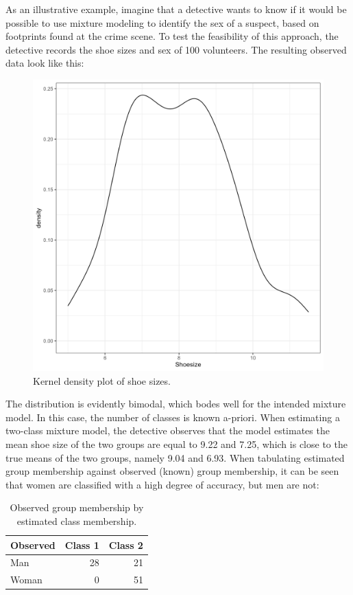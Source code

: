 \documentclass[
  ,man,floatsintext]{apa6}
\begin{document}
As an illustrative example, imagine that a detective wants to know if it
would be possible to use mixture modeling to identify the sex of a
suspect, based on footprints found at the crime scene. To test the
feasibility of this approach, the detective records the shoe sizes and
sex of 100 volunteers. The resulting observed data look like this:

\begin{figure}
\includegraphics[width=7in]{shoedens} \caption{Kernel density plot of shoe sizes.}\label{fig:shoedens}
\end{figure}

The distribution is evidently bimodal, which bodes well for the intended
mixture model. In this case, the number of classes is known a-priori.
When estimating a two-class mixture model, the detective observes that
the model estimates the mean shoe size of the two groups are equal to
9.22 and
7.25, which is close to the true
means of the two groups, namely 9.04
and 6.93. When tabulating estimated
group membership against observed (known) group membership, it can be
seen that women are classified with a high degree of accuracy, but men
are not:

\begin{table}

\caption{\label{tab:tabshoe}Observed group membership by estimated class membership.}
\centering
\begin{tabular}[t]{l|r|r}
\hline
Observed & Class 1 & Class 2\\
\hline
Man & 28 & 21\\
\hline
Woman & 0 & 51\\
\hline
\end{tabular}
\end{table}
\end{document}
